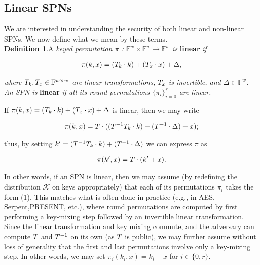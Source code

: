 \subsection{Linear SPNs}
We are interested in understanding the security of both linear and non-linear SPNs. We now define what we mean by these terms.\\

\noindent \textbf{Definition 1}.A \emph{keyed permutation $\pi$ : $\mathbb{F}^{w} \times \mathbb{F}^{w} \rightarrow \mathbb{F}^{w}$ is} \textbf{linear} \emph{if}

$$
\begin{aligned}
\pi(k,x) = (\mathnormal{T}_{k} \cdot k) + (\mathnormal{T}_{x} \cdot x) + \Delta,
\end{aligned}
$$

\emph{where $\mathnormal{T}_{k}, \mathnormal{T}_{x} \in \mathbb{F}^{w \times w}$ are linear transformations, $\mathnormal{T}_{x}$ is invertible, and $\Delta \in \mathbb{F}^{w}$. An SPN is} \textbf{linear} \emph{ if all its round permutations $\{\pi_{i}\}_{i=0}^{r}$ are linear.}

If $\pi(k,x) = (\mathnormal{T}_{k} \cdot k) + (\mathnormal{T}_{x} \cdot x) + \Delta$ is linear, then we may write

$$
\begin{aligned}
\pi(k,x) = \mathnormal{T} \cdot ((\mathnormal{T}^{-1} \mathnormal{T}_{k} \cdot k) + (\mathnormal{T}^{-1} \cdot \Delta) + x);
\end{aligned}
$$

thus, by setting $k^{\prime} = (\mathnormal{T}^{-1} \mathnormal{T}_{k} \cdot k) + (\mathnormal{T}^{-1} \cdot \Delta)$  we can express $\pi$ as

\begin{equation}
\begin{aligned}
\pi(k^{\prime},x) = \mathnormal{T} \cdot (k^{\prime} + x).
\end{aligned}
\end{equation}

In other words, if an SPN is linear, then we may assume (by redefining the distribution $\mathcal{K}$  on keys appropriately) that each of its permutations $\pi_{i}$ takes the
form (1). This matches what is often done in practice (e.g., in AES, Serpent,PRESENT, etc.), where round permutations are computed by first performing a key-mixing step followed by an invertible linear transformation. Since the linear transformation and key mixing commute, and the adversary can compute $\mathnormal{T}$ and $\mathnormal{T}^{-1}$ on its own (as  $\mathnormal{T}$ is public), we may further assume without loss of generality that the first and last permutations involve only a key-mixing step. In other words, we may set
$\pi_{i}(k_{i},x) = k_{i} + x$ for $i \in \{0,r\}$.


